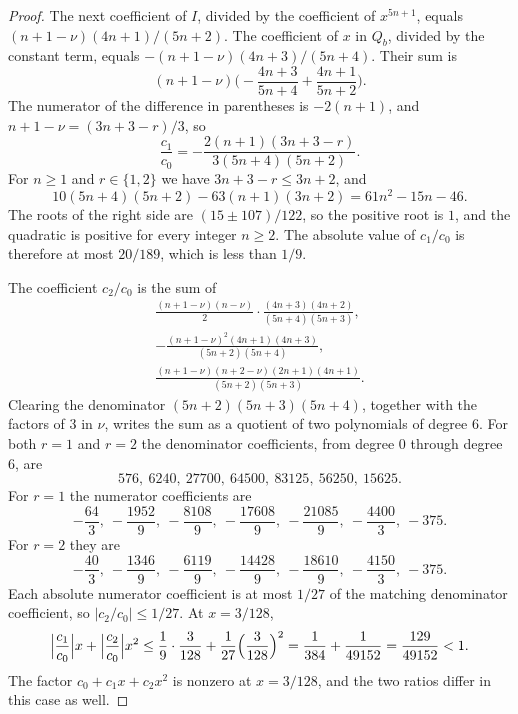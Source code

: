 \documentclass[11pt]{article}
\begin{document}
\begin{proof}
The next coefficient of $I$, divided by the coefficient of $x^{5n + 1}$, equals $(n + 1 - \nu)(4n + 1)/(5n + 2)$.
The coefficient of $x$ in $Q_b$, divided by the constant term, equals $-(n + 1 - \nu)(4n + 3)/(5n + 4)$.
Their sum is
\[
(n + 1 - \nu)\Biggl( -\frac{4n + 3}{5n + 4} + \frac{4n + 1}{5n + 2} \Biggr).
\]
The numerator of the difference in parentheses is $-2(n + 1)$, and $n + 1 - \nu = (3n + 3 - r)/3$, so
\[
\frac{c_1}{c_0} = -\frac{2(n + 1)(3n + 3 - r)}{3(5n + 4)(5n + 2)}.
\]
For $n \ge 1$ and $r \in \{1, 2\}$ we have $3n + 3 - r \le 3n + 2$, and
\[
10(5n + 4)(5n + 2) - 63(n + 1)(3n + 2) = 61n^2 - 15n - 46.
\]
The roots of the right side are $(15 \pm 107)/122$, so the positive root is $1$, and the quadratic is positive for every integer $n \ge 2$.
The absolute value of $c_1/c_0$ is therefore at most $20/189$, which is less than $1/9$.

The coefficient $c_2/c_0$ is the sum of
\begin{align*}
\frac{(n + 1 - \nu)(n - \nu)}{2} \cdot \frac{(4n + 3)(4n + 2)}{(5n + 4)(5n + 3)}, \\
-\frac{(n + 1 - \nu)^2 (4n + 1)(4n + 3)}{(5n + 2)(5n + 4)}, \\
\frac{(n + 1 - \nu)(n + 2 - \nu)(2n + 1)(4n + 1)}{(5n + 2)(5n + 3)}.
\end{align*}
Clearing the denominator $(5n+2)(5n+3)(5n+4)$, together with the factors of $3$ in $\nu$, writes the sum as a quotient of two polynomials of degree $6$.
For both $r = 1$ and $r = 2$ the denominator coefficients, from degree $0$ through degree $6$, are
\[
576,\ 6240,\ 27700,\ 64500,\ 83125,\ 56250,\ 15625.
\]
For $r = 1$ the numerator coefficients are
\[
-\frac{64}{3},\ -\frac{1952}{9},\ -\frac{8108}{9},\ -\frac{17608}{9},\ -\frac{21085}{9},\ -\frac{4400}{3},\ -375.
\]
For $r = 2$ they are
\[
-\frac{40}{3},\ -\frac{1346}{9},\ -\frac{6119}{9},\ -\frac{14428}{9},\ -\frac{18610}{9},\ -\frac{4150}{3},\ -375.
\]
Each absolute numerator coefficient is at most $1/27$ of the matching denominator coefficient, so $\lvert c_2/c_0 \rvert \le 1/27$.
At $x = 3/128$,
\[
\Bigl\lvert \frac{c_1}{c_0} \Bigr\rvert x + \Bigl\lvert \frac{c_2}{c_0} \Bigr\rvert x^2
\le \frac19 \cdot \frac{3}{128} + \frac1{27}\Bigl(\frac{3}{128}\Bigr)^2
= \frac{1}{384} + \frac{1}{49152} = \frac{129}{49152} < 1.
\]
The factor $c_0 + c_1 x + c_2 x^2$ is nonzero at $x = 3/128$, and the two ratios differ in this case as well.


\end{proof}
\end{document}
